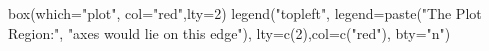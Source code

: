 \begin{Schunk}
\begin{Sinput}
 box(which="plot", col="red",lty=2)
 legend("topleft", legend=paste("The Plot Region:", "axes would lie on this edge"), lty=c(2),col=c("red"), bty="n")
\end{Sinput}
\end{Schunk}
